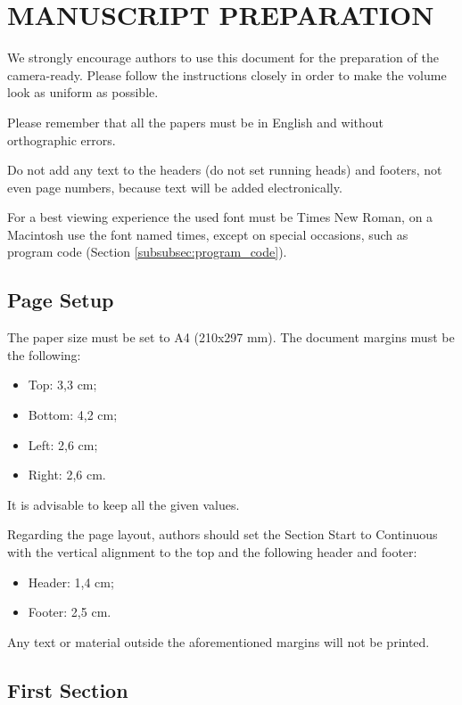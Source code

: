 \documentclass[a4paper,twoside]{article}
\begin{document}
\section{\uppercase{Manuscript Preparation}}

\noindent We strongly encourage authors to use this document for the preparation of the camera-ready. Please follow the instructions closely in order to make the volume look as uniform as possible.


Please remember that all the papers must be in English and without orthographic errors.


Do not add any text to the headers (do not set running heads) and footers, not even page numbers, because text will be added electronically.


For a best viewing experience the used font must be Times New Roman, on a Macintosh use the font named times, except on special occasions, such as program code (Section \ref{subsubsec:program_code}).

\subsection{Page Setup}

\noindent The paper size must be set to A4 (210x297 mm). The document
margins must be the following:

\begin{itemize}
    \item Top: 3,3 cm;
    \item Bottom: 4,2 cm;
    \item Left: 2,6 cm;
    \item Right: 2,6 cm.
\end{itemize}

It is advisable to keep all the given values.


Regarding the page layout, authors should set the Section Start to Continuous with the vertical alignment to the top and the following header and footer:

\begin{itemize}
    \item Header: 1,4 cm;
    \item Footer: 2,5 cm.
\end{itemize}

Any text or material outside the aforementioned margins will not be printed.

\subsection{First Section}
\end{document}
